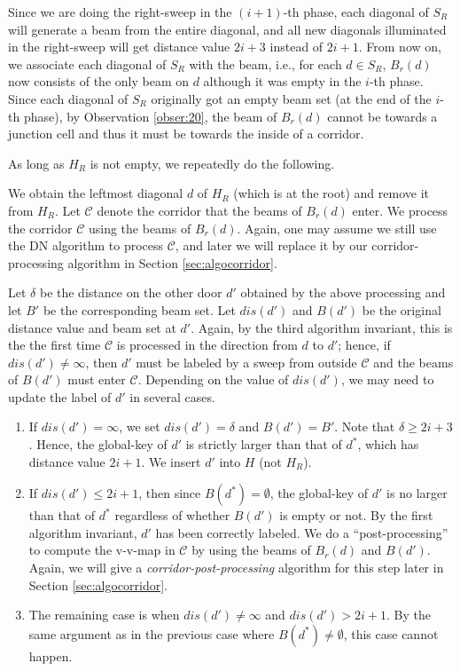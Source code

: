 \documentclass[english,runningheads,11pt]{llncs-revised}
\def\calC{\mathcal{C}}
\begin{document}
Since we are doing the right-sweep in the $(i+1)$-th phase, each
diagonal of $S_R$ will generate a beam from the entire diagonal, and
all new diagonals illuminated in the right-sweep will
get distance value $2i+3$ instead of $2i+1$.
From now on, we associate each diagonal of $S_R$ with the beam, i.e.,
for each $d\in S_R$, $B_r(d)$ now consists of the only beam on $d$ although it was
empty in the $i$-th phase. Since each diagonal of $S_R$ originally got an empty beam set (at the end of the $i$-th phase), by Observation \ref{obser:20}, the beam of $B_r(d)$ cannot be towards a junction cell and thus it must be towards the inside of a corridor.

As long as $H_R$ is not empty, we repeatedly do the following.

We obtain the leftmost diagonal $d$ of $H_R$ (which is at the root) and remove it from $H_R$. Let $\calC$ denote the corridor that the beams of $B_r(d)$ enter.
We process the corridor $\calC$ using the beams of $B_r(d)$.
Again, one may assume we still use the DN algorithm to process $\calC$,
and later we will replace it by our corridor-processing
algorithm in Section \ref{sec:algocorridor}.


Let $\delta$ be the distance on the other door $d'$ obtained by the above
processing and let $B'$ be the corresponding beam set.
Let $dis(d')$ and $B(d')$ be the original distance value and beam set
at $d'$.
Again, by the third algorithm invariant, this is the the first
time $\calC$ is processed in the direction from $d$ to $d'$; hence,
if $dis(d')\neq \infty$, then $d'$ must be labeled by a sweep from outside $\calC$
and the beams of $B(d')$ must enter $\calC$.
Depending on the value of $dis(d')$, we may need to update the label of $d'$ in several cases.


\begin{enumerate}
\item
If $dis(d')=\infty$, we set $dis(d')=\delta$ and $B(d')=B'$. Note that
$\delta\geq 2i+3$. Hence, the global-key of $d'$ is strictly larger than that of $d^*$, which has distance value $2i+1$.
We insert $d'$ into $H$ (not $H_R$).



\item
If $dis(d')\leq 2i+1$, then since $B(d^*)=\emptyset$, the global-key of $d'$ is no larger than that of $d^*$ regardless of whether $B(d')$ is empty or not. By the first algorithm invariant, $d'$ has been correctly labeled. We do a ``post-processing'' to compute the
v-v-map in $\calC$ by using the beams of $B_r(d)$ and $B(d')$. Again, we will give a {\em corridor-post-processing} algorithm for this step later in Section \ref{sec:algocorridor}.




\item
The remaining case is when $dis(d')\neq \infty$ and $dis(d')>2i+1$.
By the same argument as in the previous case where
$B(d^*)\neq\emptyset$, this case cannot happen.
\end{enumerate}
\end{document}
